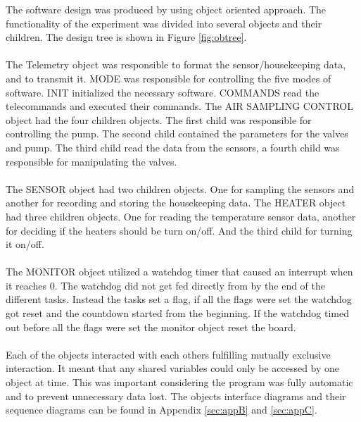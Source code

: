\begin{enumerate}[label=(\alph*)]
The software design was produced by using object oriented approach. The functionality of the experiment was divided into several objects and their children. The design tree is shown in Figure \ref{fig:obtree}.\\
\\
The Telemetry object was responsible to format the sensor/housekeeping data, and to transmit it. MODE was responsible for controlling the five modes of software. INIT initialized the necessary software. COMMANDS read the telecommands and executed their commands. The AIR SAMPLING CONTROL object had the four children objects. The first child was responsible for controlling the pump. The second child contained the parameters for the valves and pump. The third child read the data from the sensors, a fourth child was responsible for manipulating the valves.\\
\\
The SENSOR object had two children objects. One for sampling the sensors and another for recording and storing the housekeeping data. The HEATER object had three children objects. One for reading the temperature sensor data, another for deciding if the heaters should be turn on/off. And the third child for turning it on/off.\\ 
\\
The MONITOR object utilized a watchdog timer that caused an interrupt when it reaches 0. The watchdog did not get fed directly from by the end of the different tasks. Instead the tasks set a flag, if all the flags were set the watchdog got reset and the countdown started from the beginning. If the watchdog timed out before all the flags were set the monitor object reset the board.\\
\\
Each of the objects interacted with each others fulfilling mutually exclusive interaction. It meant that any shared variables could only be accessed by one object at time. This was important considering the program was fully automatic and to prevent unnecessary data lost. The objects interface diagrams and their sequence diagrams can be found in Appendix \ref{sec:appB} and \ref{sec:appC}.
\end{enumerate}
